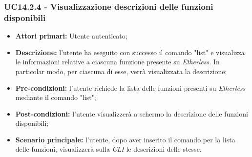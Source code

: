 \subsubsection{UC14.2.4 - Visualizzazione descrizioni delle funzioni disponibili}
\begin{itemize}
	\item \textbf{Attori primari:} Utente autenticato;
	\item \textbf{Descrizione:} l'utente ha eseguito con successo il comando "list" e visualizza le informazioni relative a ciascuna funzione presente su \textit{Etherless}. In particolar modo, per ciascuna di esse, verrà visualizzata la descrizione; 
	\item \textbf{Pre-condizioni:} l'utente richiede la lista delle funzioni presenti su \textit{Etherless} mediante il comando "list"; 
	\item \textbf{Post-condizioni:} l'utente visualizzerà a schermo la descrizione delle funzioni disponibili;
	\item \textbf{Scenario principale:} l'utente, dopo aver inserito il comando per la lista delle funzioni, visualizzerà sulla \textit{CLI\glo} le descrizioni delle stesse.
\end{itemize}